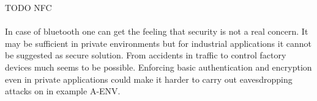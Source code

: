 \documentclass[12pt,a4paper]{article}
\begin{document}
TODO NFC\\
\\
In case of bluetooth one can get the feeling that security is not a real concern. It may be sufficient in private environments but for industrial applications it cannot be suggested as secure solution. From accidents in traffic to control factory devices much seems to be possible. Enforcing basic authentication and encryption even in private applications could make it harder to carry out eavesdropping attacks on in example A-ENV.

{}

\end{document}

